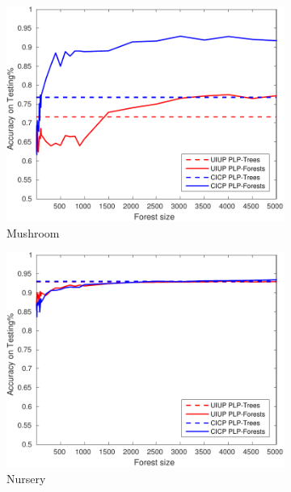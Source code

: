 \begin{figure}[ht]
\begin{subfigure}[b]{0.3\textwidth}
  	\includegraphics[width=\textwidth]{figs/PLPTF/Forests/MushroomDownsampled_Forests_MH.pdf}
  	\caption{Mushroom}
		\label{fig:Mush4}
	\end{subfigure}
  \begin{subfigure}[b]{0.3\textwidth}
		\centering
  	\includegraphics[width=\textwidth]{figs/PLPTF/Forests/NurseryDownsampledFurther_Forests_MH.pdf}
  	\caption{Nursery}
		\label{fig:N4}
	\end{subfigure}
  \begin{subfigure}[b]{0.3\textwidth}
		\centering

\end{subfigure}
\end{figure}
